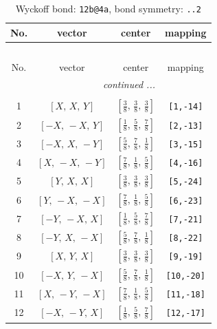 \documentclass[fleqn,8pt]{jsarticle}
\begin{document}
\begin{longtable}{cccc}
\caption{Wyckoff bond: {\tt 12b@4a}, bond symmetry: {\tt ..2}}
 \\
 \hline \hline
No. & vector & center & mapping \\ \hline \endfirsthead

\multicolumn{3}{l}{\tablename\ \thetable{}} \\
 \hline \hline
No. & vector & center & mapping \\ \hline \endhead

 \hline \hline
\multicolumn{3}{r}{\footnotesize\it continued ...} \\ \endfoot

 \hline \hline
\multicolumn{3}{r}{} \\ \endlastfoot

1 & $\left[ X,\, X,\, Y \right]$ & $\left[ \frac{3}{8},\, \frac{3}{8},\, \frac{3}{8} \right]$ & {\tt [1,-14]} \\ \hline
2 & $\left[ - X,\, - X,\, Y \right]$ & $\left[ \frac{1}{8},\, \frac{5}{8},\, \frac{7}{8} \right]$ & {\tt [2,-13]} \\ \hline
3 & $\left[ - X,\, X,\, - Y \right]$ & $\left[ \frac{5}{8},\, \frac{7}{8},\, \frac{1}{8} \right]$ & {\tt [3,-15]} \\ \hline
4 & $\left[ X,\, - X,\, - Y \right]$ & $\left[ \frac{7}{8},\, \frac{1}{8},\, \frac{5}{8} \right]$ & {\tt [4,-16]} \\ \hline
5 & $\left[ Y,\, X,\, X \right]$ & $\left[ \frac{3}{8},\, \frac{3}{8},\, \frac{3}{8} \right]$ & {\tt [5,-24]} \\ \hline
6 & $\left[ Y,\, - X,\, - X \right]$ & $\left[ \frac{7}{8},\, \frac{1}{8},\, \frac{5}{8} \right]$ & {\tt [6,-23]} \\ \hline
7 & $\left[ - Y,\, - X,\, X \right]$ & $\left[ \frac{1}{8},\, \frac{5}{8},\, \frac{7}{8} \right]$ & {\tt [7,-21]} \\ \hline
8 & $\left[ - Y,\, X,\, - X \right]$ & $\left[ \frac{5}{8},\, \frac{7}{8},\, \frac{1}{8} \right]$ & {\tt [8,-22]} \\ \hline
9 & $\left[ X,\, Y,\, X \right]$ & $\left[ \frac{3}{8},\, \frac{3}{8},\, \frac{3}{8} \right]$ & {\tt [9,-19]} \\ \hline
10 & $\left[ - X,\, Y,\, - X \right]$ & $\left[ \frac{5}{8},\, \frac{7}{8},\, \frac{1}{8} \right]$ & {\tt [10,-20]} \\ \hline
11 & $\left[ X,\, - Y,\, - X \right]$ & $\left[ \frac{7}{8},\, \frac{1}{8},\, \frac{5}{8} \right]$ & {\tt [11,-18]} \\ \hline
12 & $\left[ - X,\, - Y,\, X \right]$ & $\left[ \frac{1}{8},\, \frac{5}{8},\, \frac{7}{8} \right]$ & {\tt [12,-17]} \\
\end{longtable}
\end{document}
